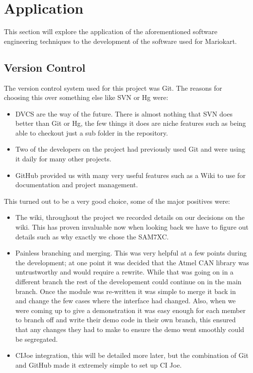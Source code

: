 \section{Application}

  This section will explore the application of the aforementioned software
  engineering techniques to the development of the software used for Mariokart.

  \subsection{Version Control}

    The version control system used for this project was Git.  The reasons for
    choosing this over something else like SVN or Hg were:

    \begin{itemize}
      \item DVCS are the way of the future.  There is almost nothing that SVN
      does better than Git or Hg, the few things it does are niche features such
      as being able to checkout just a sub folder in the repository.

      \item Two of the developers on the project had previously used Git and
      were using it daily for many other projects.

      \item GitHub provided us with many very useful features such as a Wiki to
      use for documentation and project management.
    \end{itemize}

    This turned out to be a very good choice, some of the major positives were:

    \begin{itemize}
      \item The wiki, throughout the project we recorded details on our
      decisions on the wiki.  This has proven invaluable now when looking back
      we have to figure out details such as why exactly we chose the SAM7XC.

      \item Painless branching and merging.  This was very helpful at a few
      points during the development; at one point it was decided that the Atmel
      CAN library was untrustworthy and would require a rewrite.  While that was
      going on in a different branch the rest of the developement could continue
      on in the main branch.  Once the module was re-written it was simple to
      merge it back in and change the few cases where the interface had changed.
      Also, when we were coming up to give a demonstration it was easy enough
      for each member to branch off and write their demo code in their own
      branch, this ensured that any changes they had to make to ensure the demo
      went smoothly could be segregated.

      \item CIJoe integration, this will be detailed more later, but the
      combination of Git and GitHub made it extremely simple to set up CI Joe.
    \end{itemize}

